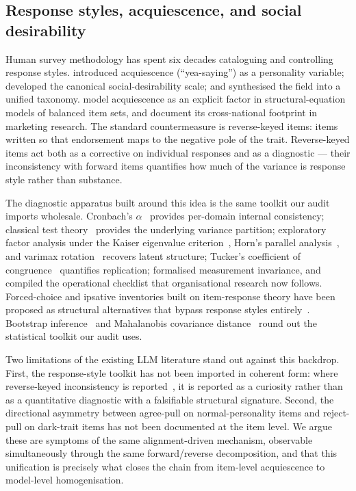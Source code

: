 \documentclass[11pt]{article}
\begin{document}
\subsection{Response styles, acquiescence, and social desirability}
\label{sec:related-styles}

Human survey methodology has spent six decades cataloguing and controlling response styles. \citet{couch1960yeasayers} introduced acquiescence (``yea-saying'') as a personality variable; \citet{crowne1960social} developed the canonical social-desirability scale; and \citet{paulhus1991response} synthesised the field into a unified taxonomy. \citet{billiet2000modeling} model acquiescence as an explicit factor in structural-equation models of balanced item sets, and \citet{baumgartner2007modeling} document its cross-national footprint in marketing research. The standard countermeasure is reverse-keyed items: items written so that endorsement maps to the negative pole of the trait. Reverse-keyed items act both as a corrective on individual responses and as a diagnostic --- their inconsistency with forward items quantifies how much of the variance is response style rather than substance.

The diagnostic apparatus built around this idea is the same toolkit our audit imports wholesale. Cronbach's $\alpha$~\citep{cronbach1951coefficient} provides per-domain internal consistency; classical test theory~\citep{lord1968statistical} provides the underlying variance partition; exploratory factor analysis under the Kaiser eigenvalue criterion~\citep{kaiser1960application}, Horn's parallel analysis~\citep{horn1965parallel}, and varimax rotation~\citep{kaiser1958varimax} recovers latent structure; Tucker's coefficient of congruence~\citep{tucker1951method} quantifies replication; \citet{meredith1993measurement} formalised measurement invariance, and \citet{vandenberg2000review} compiled the operational checklist that organisational research now follows. Forced-choice and ipsative inventories built on item-response theory have been proposed as structural alternatives that bypass response styles entirely~\citep{brown2011forcedchoice,treaux2025forced}. Bootstrap inference~\citep{efron1979bootstrap} and Mahalanobis covariance distance~\citep{mahalanobis1936generalised} round out the statistical toolkit our audit uses.

Two limitations of the existing LLM literature stand out against this backdrop. First, the response-style toolkit has not been imported in coherent form: where reverse-keyed inconsistency is reported~\citep{acquiescence2025emnlp}, it is reported as a curiosity rather than as a quantitative diagnostic with a falsifiable structural signature. Second, the directional asymmetry between agree-pull on normal-personality items and reject-pull on dark-trait items has not been documented at the item level. We argue these are symptoms of the same alignment-driven mechanism, observable simultaneously through the same forward/reverse decomposition, and that this unification is precisely what closes the chain from item-level acquiescence to model-level homogenisation.
\end{document}

